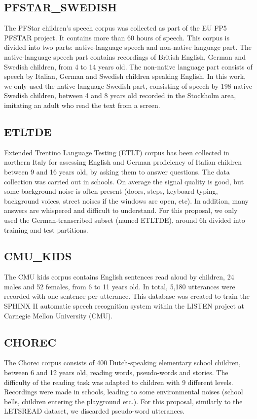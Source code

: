 \subsection{PFSTAR\_SWEDISH}
The PFStar children's speech corpus \cite{pfstar} was collected as part of the EU FP5 PFSTAR project. It contains more than 60 hours of speech. This corpus is divided into two parts: native-language speech and non-native language part.
The native-language speech part contains recordings of British English, German and Swedish children, from 4 to 14 years old. The non-native language part consists of speech by Italian, German and Swedish children speaking English. In this work, we only used the native language Swedish part, consisting of speech by 198 native Swedish children, between 4 and 8 years old recorded in the Stockholm area, imitating an adult who read the text from a screen.
\subsection{ETLTDE}
Extended Trentino Language Testing (ETLT) corpus \cite{etlt} has been collected in northern Italy for assessing English and German proficiency of Italian children between 9 and 16 years old, by asking them to answer questions. The data collection was carried out in schools. On average the signal quality is good, but some background noise is often present (doors, steps, keyboard typing, background voices, street noises if the windows are open, etc). In addition, many answers are whispered and difficult to understand.
For this proposal, we only used the German-transcribed subset (named ETLTDE), around 6h divided into training and test partitions.
\subsection{CMU\_KIDS}
The CMU kids corpus \cite{cmu} contains English sentences read aloud by children, 24 males and 52 females, from 6 to 11 years old. In total, 5,180 utterances were recorded with one sentence per utterance. This database was created to train the SPHINX II \cite{sphinx2} automatic speech recognition system within the LISTEN project at Carnegie Mellon University (CMU).
\subsection{CHOREC}
\label{subsection:chorec}
The Chorec corpus \cite{chorec} consists of 400 Dutch-speaking elementary school children, between 6 and 12 years old, reading words, pseudo-words and stories. The difficulty of the reading task was adapted to children with 9 different levels. Recordings were made in schools, leading to some environmental noises (school bells, children entering the playground etc.). For this proposal, similarly to the LETSREAD dataset, we discarded pseudo-word utterances.

